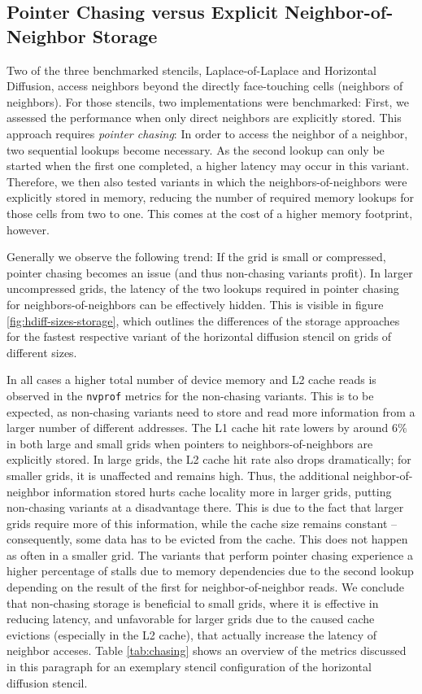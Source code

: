 \subsection{Pointer Chasing versus Explicit Neighbor-of-Neighbor Storage}
\label{sec:results-chasing}

Two of the three benchmarked stencils, Laplace-of-Laplace and Horizontal Diffusion, access neighbors beyond the directly face-touching cells (neighbors of neighbors). For those stencils, two implementations were benchmarked: First, we assessed the performance when only direct neighbors are explicitly stored. This approach requires \emph{pointer chasing}: In order to access the neighbor of a neighbor, two sequential lookups become necessary. As the second lookup can only be started when the first one completed, a higher latency may occur in this variant. Therefore, we then also tested variants in which the neighbors-of-neighbors were explicitly stored in memory, reducing the number of required memory lookups for those cells from two to one. This comes at the cost of a higher memory footprint, however.

Generally we observe the following trend: If the grid is small or compressed, pointer chasing becomes an issue (and thus non-chasing variants profit). In larger uncompressed grids, the latency of the two lookups required in pointer chasing for neighbors-of-neighbors can be effectively hidden. This is visible in figure \ref{fig:hdiff-sizes-storage}, which outlines the differences of the storage approaches for the fastest respective variant of the horizontal diffusion stencil on grids of different sizes. 

In all cases a higher total number of device memory and L2 cache reads is observed in the \texttt{nvprof} metrics for the non-chasing variants. This is to be expected, as non-chasing variants need to store and read more information from a larger number of different addresses. The L1 cache hit rate lowers by around $6\%$ in both large and small grids when pointers to neighbors-of-neighbors are explicitly stored. In large grids, the L2 cache hit rate also drops dramatically; for smaller grids, it is unaffected and remains high. Thus, the additional neighbor-of-neighbor information stored hurts cache locality more in larger grids, putting non-chasing variants at a disadvantage there. This is due to the fact that larger grids require more of this information, while the cache size remains constant -- consequently, some data has to be evicted from the cache. This does not happen as often in a smaller grid. The variants that perform pointer chasing experience a higher percentage of stalls due to memory dependencies due to the second lookup depending on the result of the first for neighbor-of-neighbor reads.  We conclude that non-chasing storage is beneficial to small grids, where it is effective in reducing latency, and unfavorable for larger grids due to the caused cache evictions (especially in the L2 cache), that actually increase the latency of neighbor acceses. Table \ref{tab:chasing} shows an overview of the metrics discussed in this paragraph for an exemplary stencil configuration of the horizontal diffusion stencil.

